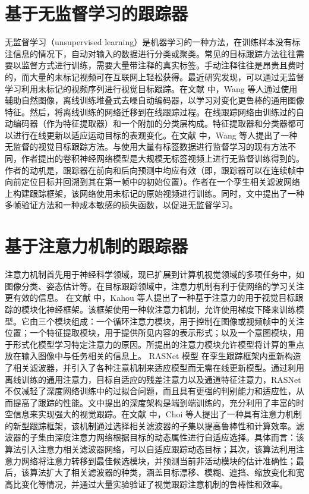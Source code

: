 \section{基于无监督学习的跟踪器}
无监督学习（unsupervised learning）是机器学习的一种方法，在训练样本没有标注信息的情况下，自动对输入的数据进行分类或聚类。常见的目标跟踪方法往往需要以监督方式进行训练，需要大量带注释的真实标签。手动注释往往是昂贵且费时的，而大量的未标记视频可在互联网上轻松获得。最近研究发现，可以通过无监督学习利用未标记的视频序列进行视觉目标跟踪。在文献 \cite{wang2013learning} 中，Wang 等人通过使用辅助自然图像，离线训练堆叠式去噪自动编码器，以学习对变化更鲁棒的通用图像特征。然后，将离线训练的网络迁移到在线跟踪过程。在线跟踪网络由训练过的自动编码器（作为特征提取器）和一个附加的分类层构成。特征提取器和分类器都可以进行在线更新以适应运动目标的表观变化。在文献 \cite{wang2019unsupervised} 中，Wang 等人提出了一种无监督的视觉目标跟踪方法。与使用大量有标签数据进行监督学习的现有方法不同，作者提出的卷积神经网络模型是大规模无标签视频上进行无监督训练得到的。作者的动机是，跟踪器在前向和后向预测中均应有效（即，跟踪器可以在连续帧中向前定位目标并回溯到其在第一帧中的初始位置）。作者在一个孪生相关滤波网络上构建跟踪框架，该网络使用未标记的原始视频进行训练。同时，文中提出了一种多帧验证方法和一种成本敏感的损失函数，以促进无监督学习。
\section{基于注意力机制的跟踪器}
注意力机制首先用于神经科学领域，现已扩展到计算机视觉领域的多项任务中，如图像分类、姿态估计等。在目标跟踪领域中，注意力机制有利于使网络的学习关注更有效的信息。
在文献 \cite{RATM} 中，Kahou 等人提出了一种基于注意力的用于视觉目标跟踪的模块化神经框架。该框架使用一种软注意力机制，允许使用梯度下降来训练模型。它由三个模块组成：一个循环注意力模块，用于控制在图像或视频帧中的关注位置；一个特征提取模块，用于提供所见内容的表示形式；以及一个意图模块，用于形式化模型学习特定注意力的原因。所提出的注意力模块允许模型将计算的重点放在输入图像中与任务相关的信息上。%
RASNet 模型 \cite{wang2018learning} 在孪生跟踪框架内重新构造了相关滤波器，并引入了各种注意机制来适应模型而无需在线更新模型。通过利用离线训练的通用注意力，目标自适应的残差注意力以及通道特征注意力，RASNet 不仅减轻了深度网络训练中的过拟合问题，而且具有更强的判别能力和适应性，从而提高了跟踪的性能。文中提出的深度架构是端到端训练的，充分利用了丰富的时空信息来实现强大的视觉跟踪。在文献 \cite{choi2017attentional} 中，Choi 等人提出了一种具有注意力机制的新型跟踪框架，该机制通过选择相关滤波器的子集以提高鲁棒性和计算效率。滤波器的子集由深度注意力网络根据目标的动态属性进行自适应选择。具体而言：该算法引入注意力相关滤波器网络，可以自适应跟踪动态目标；其次，该算法利用注意力网络将注意力转移到最佳候选模块，并预测当前非活动模块的估计准确性；最后，该算法扩大了相关滤波器的种类，涵盖目标漂移、模糊、遮挡、缩放变化和宽高比变化等情况，并通过大量实验验证了视觉跟踪注意机制的鲁棒性和效率。
